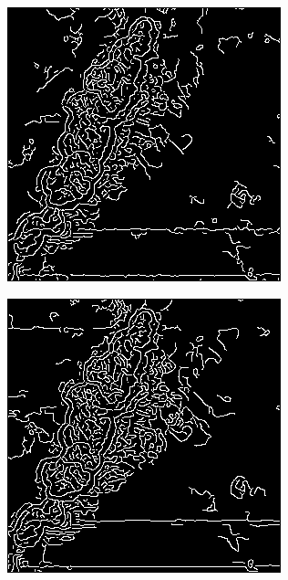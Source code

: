 \documentclass[../main.tex]{subfiles}
\begin{document}
\begin{figure}[!ht]
\begin{subfigure}{0.3\linewidth}
	\end{subfigure}
	\hfill
	\begin{subfigure}{0.3\linewidth}
		\centering
		\includegraphics[keepaspectratio, width=\linewidth]{images/nlm_edge.png}
	\end{subfigure}
	\hfill
	\begin{subfigure}{0.3\linewidth}
		\centering
		\includegraphics[keepaspectratio, width=\linewidth]{images/bm3d_edge.png}

\end{subfigure}
\end{figure}
\end{document}
